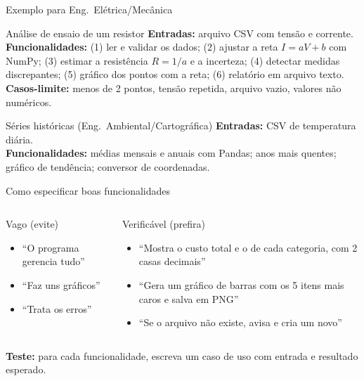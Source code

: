 \documentclass[aspectratio=169,10pt,t]{beamer}
\begin{document}
\begin{frame}{Exemplo para Eng.\ Elétrica/Mecânica}
  \small
  \begin{block}{Análise de ensaio de um resistor}
    \textbf{Entradas:} arquivo CSV com tensão e corrente.\\
    \textbf{Funcionalidades:} (1) ler e validar os dados; (2) ajustar a reta \(I=aV+b\) com NumPy; (3) estimar a resistência \(R=1/a\) e a incerteza; (4) detectar medidas discrepantes; (5) gráfico dos pontos com a reta; (6) relatório em arquivo texto.\\
    \textbf{Casos-limite:} menos de 2 pontos, tensão repetida, arquivo vazio, valores não numéricos.
  \end{block}
  \begin{block}{Séries históricas (Eng.\ Ambiental/Cartográfica)}
    \textbf{Entradas:} CSV de temperatura diária.\\
    \textbf{Funcionalidades:} médias mensais e anuais com Pandas; anos mais quentes; gráfico de tendência; conversor de coordenadas.
  \end{block}
\end{frame}

\begin{frame}{Como especificar boas funcionalidades}
  \begin{columns}[T]
    \begin{alertblock}{Vago (evite)}
      \begin{itemize}\small
        \item ``O programa gerencia tudo''
        \item ``Faz uns gráficos''
        \item ``Trata os erros''
      \end{itemize}
    \end{alertblock}
    \begin{exampleblock}{Verificável (prefira)}
      \begin{itemize}\small
        \item ``Mostra o custo total e o de cada categoria, com 2 casas decimais''
        \item ``Gera um gráfico de barras com os 5 itens mais caros e salva em PNG''
        \item ``Se o arquivo não existe, avisa e cria um novo''
      \end{itemize}
    \end{exampleblock}
  \end{columns}
  \vspace{1ex}
  \textbf{Teste:} para cada funcionalidade, escreva um caso de uso com entrada e resultado esperado.
\end{frame}
\end{document}
